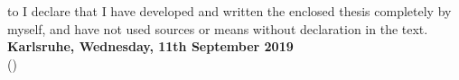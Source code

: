 
\thispagestyle{empty}
\null\vfill
\noindent\hbox to \textwidth{\hrulefill}
I declare that I have developed and written the enclosed
thesis completely by myself, and have not used sources or means without
declaration in the text.\\
\textbf{Karlsruhe, Wednesday, 11th September 2019}
\vspace{1.5cm}
\hspace*{8.0cm}\\
\hspace*{2cm}(\theauthor) 
\cleardoublepage